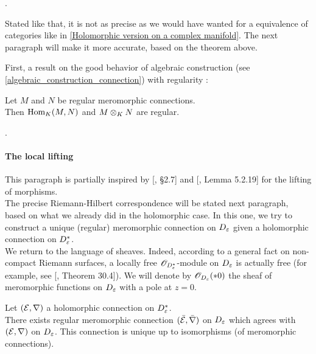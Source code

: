 \begin{mydemo}
.
\end{mydemo}

Stated like that, it is not as precise as we would have wanted for a equivalence of categories like in \ref{Holomorphic version on a complex manifold}. The next paragraph will make it more accurate, based on the theorem above.

\medskip
First, a result on the good behavior of algebraic construction (see \ref{algebraic_construction_connection}) with regularity :


\begin{myprop} \label{algebraic_regular_connection}
Let $M$ and $N$ be regular meromorphic connections.\\
Then $\text{Hom}_K(M,N)$ and $M \otimes_{K} N$ are regular.
\end{myprop}

\begin{mydemo}
.
\end{mydemo}













\paragraph{The local lifting}


This paragraph is partially inspired by [\cite{szamuely_galois}, §2.7] and [\cite{HTT_dmodules}, Lemma 5.2.19] for the lifting of morphisms.\\
The precise Riemann-Hilbert correspondence will be stated next paragraph, based on what we already did in the holomorphic case. In this one, we try to construct a unique (regular) meromorphic connection on $D_\varepsilon$ given a holomorphic connection on $D_\varepsilon^*$.\\
We return to the language of sheaves. Indeed, according to a general fact on non-compact Riemann surfaces, a locally free $\mathscr{O}_{D_\varepsilon^*}$-module on $D_\varepsilon$ is actually free (for example, see [\cite{forster_riemann}, Theorem 30.4]).
We will denote by $\mathscr{O}_{D_\varepsilon}(*0)$ the sheaf of meromorphic functions on $D_\varepsilon$ with a pole at $z=0$.


\begin{myprop} \label{local_lifting_sheaf}
Let $(\mathcal{E},\nabla)$ a holomorphic connection on $D_\varepsilon^*$.\\
There exists regular meromorphic connection $(\bar{\mathcal{E}},\bar{\nabla})$ on $D_\varepsilon$ which agrees with $(\mathcal{E},\nabla)$ on $D_\varepsilon$. This connection is unique up to isomorphisms (of meromorphic connections).
\end{myprop}

